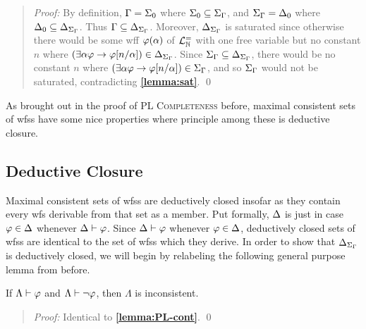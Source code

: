 \begin{quote} 
  \textit{Proof:} 
  By definition, $\Gamma=\Sigma_0$ where $\Sigma_0\subseteq\Sigma_{\Gamma}$, and $\Sigma_{\Gamma}=\Delta_0$ where $\Delta_0\subseteq\Delta_{\Sigma_{\Gamma}}$.
  Thus $\Gamma\subseteq\Delta_{\Sigma_{\Gamma}}$.
  Moreover, $\Delta_{\Sigma_{\Gamma}}$ is saturated since otherwise there would be some wff $\varphi(\alpha)$ of $\mathcal{L}^{=}_{\mathbb{N}}$ with one free variable but no constant $n$ where $(\exists \alpha\varphi \rightarrow \varphi[n/\alpha])\in\Delta_{\Sigma_{\Gamma}}$. 
  Since $\Sigma_{\Gamma}\subseteq\Delta_{\Sigma_{\Gamma}}$, there would be no constant $n$ where $(\exists \alpha\varphi \rightarrow \varphi[n/\alpha])\in\Sigma_{\Gamma}$, and so $\Sigma_{\Gamma}$ would not be saturated, contradicting \textbf{\ref{lemma:sat}}.
  \qed
\end{quote}

As brought out in the proof of \textsc{PL Completeness} before, maximal consistent sets of wfss have some nice properties where principle among these is deductive closure.



\subsection{Deductive Closure}%
  \label{sub:DeductiveClosure}

Maximal consistent sets of wfss are deductively closed insofar as they contain every wfs derivable from that set as a member.
Put formally, $\Delta$ is  just in case $\varphi\in\Delta$ whenever $\Delta\vdash\varphi$.
Since $\Delta\vdash\varphi$ whenever $\varphi\in\Delta$, deductively closed sets of wfss are identical to the set of wfss which they derive.
In order to show that $\Delta_{\Sigma_{\Gamma}}$ is deductively closed, we will begin by relabeling the following general purpose lemma from before. 

\begin{Lthm} \label{lemma:cont}
  If $\Lambda\vdash\varphi$ and $\Lambda\vdash\neg\varphi$, then $\Lambda$ is inconsistent. 
\end{Lthm}

\begin{quote} 
  \textit{Proof:} 
  Identical to \textbf{\ref{lemma:PL-cont}}.
  \qed
\end{quote}
  




